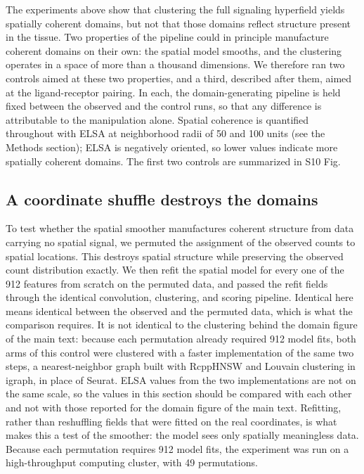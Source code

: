 \documentclass[10pt]{article}
\begin{document}
The experiments above show that clustering the full signaling hyperfield yields spatially coherent domains, but not that those domains reflect structure present in the tissue. Two properties of the pipeline could in principle manufacture coherent domains on their own: the spatial model smooths, and the clustering operates in a space of more than a thousand dimensions. We therefore ran two controls aimed at these two properties, and a third, described after them, aimed at the ligand-receptor pairing. In each, the domain-generating pipeline is held fixed between the observed and the control runs, so that any difference is attributable to the manipulation alone. Spatial coherence is quantified throughout with ELSA at neighborhood radii of 50 and 100 units (see the Methods section); ELSA is negatively oriented, so lower values indicate more spatially coherent domains. The first two controls are summarized in S10 Fig.

\subsection*{A coordinate shuffle destroys the domains}

To test whether the spatial smoother manufactures coherent structure from data carrying no spatial signal, we permuted the assignment of the observed counts to spatial locations. This destroys spatial structure while preserving the observed count distribution exactly. We then refit the spatial model for every one of the 912 features from scratch on the permuted data, and passed the refit fields through the identical convolution, clustering, and scoring pipeline. Identical here means identical between the observed and the permuted data, which is what the comparison requires. It is not identical to the clustering behind the domain figure of the main text: because each permutation already required 912 model fits, both arms of this control were clustered with a faster implementation of the same two steps, a nearest-neighbor graph built with RcppHNSW and Louvain clustering in igraph, in place of Seurat. ELSA values from the two implementations are not on the same scale, so the values in this section should be compared with each other and not with those reported for the domain figure of the main text. Refitting, rather than reshuffling fields that were fitted on the real coordinates, is what makes this a test of the smoother: the model sees only spatially meaningless data. Because each permutation requires 912 model fits, the experiment was run on a high-throughput computing cluster, with 49 permutations.
\end{document}
